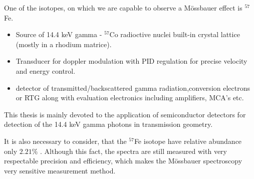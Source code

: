 One of the isotopes, on which we are capable to observe a Mössbauer effect is $^{57}$Fe.

\begin{itemize}

\item Source of 14.4 keV gamma - $^{57}$Co radioctive nuclei built-in crystal lattice (mostly in a rhodium matrice).
\item Transducer for doppler modulation with PID regulation for precise velocity and energy control. 
\item detector of transmitted/backscattered gamma radiation,conversion electrons or RTG along with evaluation electronics including amplifiers, MCA's etc.

\end{itemize}

This thesis is mainly devoted to the application of semiconductor detectors for detection of the 14.4 keV gamma photons in transmission geometry.

It is also necessary to consider, that the $^{57}$Fe isotope have relative abundance only $2.21 \%$ \cite{compounds}. Although this fact, the spectra are still measured with very respectable precision and efficiency, which makes the Mössbauer spectroscopy very sensitive measurement method.
